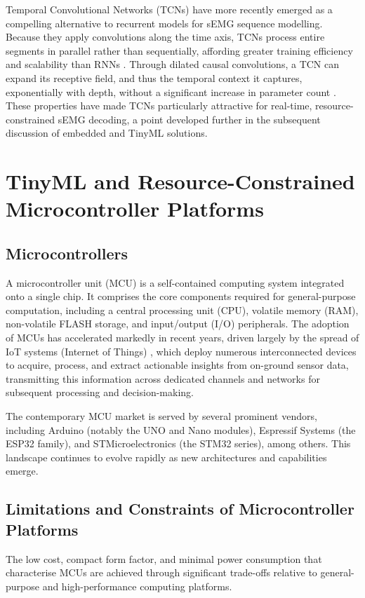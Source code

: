 \documentclass[12pt,DIV16,BCOR12mm,a4paper,footinclude=false,headinclude,parskip=half-,twoside,openright,cleardoublepage=empty,toc=index,bibliography=totoc,listof=totoc]{scrreprt}
\numberwithin{equation}{chapter}
\begin{document}
    Temporal Convolutional Networks (TCNs) have more recently emerged as a compelling alternative to recurrent
    models for sEMG sequence modelling. Because they apply convolutions along the time axis, TCNs process entire
    segments in parallel rather than sequentially, affording greater training efficiency and scalability than RNNs
    \cite{zhongDeepFeatureLearning2026}. Through dilated causal convolutions, a TCN can expand its receptive
    field, and thus the temporal context it captures, exponentially with depth, without a significant increase
    in parameter count \cite{zanghieriRobustRealTimeEmbedded2020, zhongDeepFeatureLearning2026}. These properties
    have made TCNs particularly attractive for real-time, resource-constrained sEMG decoding, a point developed
    further in the subsequent discussion of embedded and TinyML solutions.

  \section{TinyML and Resource-Constrained Microcontroller Platforms} 
    \subsection{Microcontrollers}
    A microcontroller unit (MCU) is a self-contained computing system integrated onto a single chip. 
    It comprises the core components required for general-purpose computation, including a central processing unit (CPU), volatile memory (RAM),
    non-volatile FLASH storage, and input/output (I/O) peripherals. The adoption of MCUs has accelerated markedly
    in recent years, driven largely by the spread of IoT systems (Internet of Things) \cite{yelchuriReviewTinyML2022},
    which deploy numerous interconnected devices to acquire, process, and extract actionable insights from
    on-ground sensor data, transmitting this information across dedicated channels and networks for subsequent
    processing and decision-making.

    The contemporary MCU market is served by several prominent vendors, including Arduino (notably the UNO and Nano modules), Espressif Systems (the ESP32
    family), and STMicroelectronics (the STM32 series), among others. This landscape continues to evolve rapidly as new architectures and capabilities emerge.

    \subsection{Limitations and Constraints of Microcontroller Platforms}
    The low cost, compact form factor, and minimal power consumption that characterise MCUs are achieved through significant trade-offs relative to
    general-purpose and high-performance computing platforms.
\end{document}
